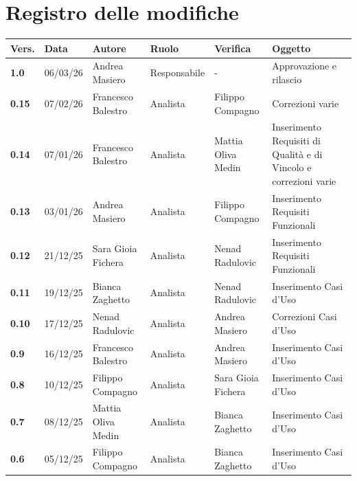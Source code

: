 \documentclass[a4paper,12pt]{article}
\begin{document}
    

    \section*{Registro delle modifiche} {
        \begin{table}[h!]
                \begin{tabularx}{\textwidth}{|l|l|l|l|L|L|}
                \hline
                \textbf{Vers.} & \textbf{Data} & \textbf{Autore} & \textbf{Ruolo} & \textbf{Verifica} & \textbf{Oggetto} \\
                \hline
                \textbf{1.0} & 06/03/26 & Andrea Masiero & Responsabile & - & Approvazione e rilascio \\
                \hline
                \textbf{0.15} & 07/02/26 & Francesco Balestro & Analista & Filippo Compagno & Correzioni varie \\
                \hline
                \textbf{0.14} & 07/01/26 & Francesco Balestro & Analista & Mattia Oliva Medin & Inserimento Requisiti di Qualità e di Vincolo e correzioni varie \\
                \hline
                \textbf{0.13} & 03/01/26 & Andrea Masiero & Analista & Filippo Compagno & Inserimento Requisiti Funzionali \\
                \hline
                \textbf{0.12} & 21/12/25 &  Sara Gioia Fichera & Analista & Nenad Radulovic & Inserimento Requisiti Funzionali \\
                \hline
                \textbf{0.11} & 19/12/25 & Bianca Zaghetto & Analista & Nenad Radulovic & Inserimento Casi d'Uso \\
                \hline
                \textbf{0.10} & 17/12/25 & Nenad Radulovic & Analista & Andrea Masiero & Correzioni Casi d'Uso \\
                \hline
                \textbf{0.9} & 16/12/25 & Francesco Balestro & Analista & Andrea Masiero & Inserimento Casi d'Uso \\
                \hline
                \textbf{0.8} & 10/12/25 & Filippo Compagno & Analista & Sara Gioia Fichera & Inserimento Casi d'Uso \\
                \hline
                \textbf{0.7} & 08/12/25 & Mattia Oliva Medin & Analista & Bianca Zaghetto & Inserimento Casi d'Uso \\
                \hline
                \textbf{0.6} & 05/12/25 & Filippo Compagno & Analista & Bianca Zaghetto & Inserimento Casi d'Uso \\

\end{tabularx}
\end{table}}
\end{document}
